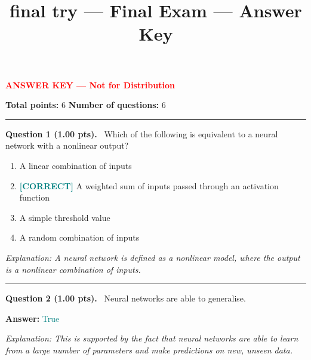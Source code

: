 \documentclass[12pt,a4paper]{article}
\title{final try — Final Exam --- Answer Key}
\date{}
\begin{document}
\maketitle

{\large \textbf{\textcolor{red}{ANSWER KEY --- Not for Distribution}}}

\vspace{0.5em}



\noindent
\textbf{Total points:} 6
\hfill
\textbf{Number of questions:} 6

\vspace{1em}
\hrule
\vspace{1.5em}


\noindent
\textbf{Question 1 (1.00 pts).}~
Which of the following is equivalent to a neural network with a nonlinear output?


\begin{enumerate}[label=\textbf{\Alph*.}]

  \item A linear combination of inputs

  \item \textbf{\textcolor{teal}{[CORRECT]}}  A weighted sum of inputs passed through an activation function

  \item A simple threshold value

  \item A random combination of inputs

\end{enumerate}



\textit{\small Explanation: A neural network is defined as a nonlinear model, where the output is a nonlinear combination of inputs.}



\vspace{0.8em}
\noindent\rule{\linewidth}{0.2pt}
\vspace{0.3em}


\noindent
\textbf{Question 2 (1.00 pts).}~
Neural networks are able to generalise.


\textbf{Answer:} \textcolor{teal}{True}



\textit{\small Explanation: This is supported by the fact that neural networks are able to learn from a large number of parameters and make predictions on new, unseen data.}
\end{document}
